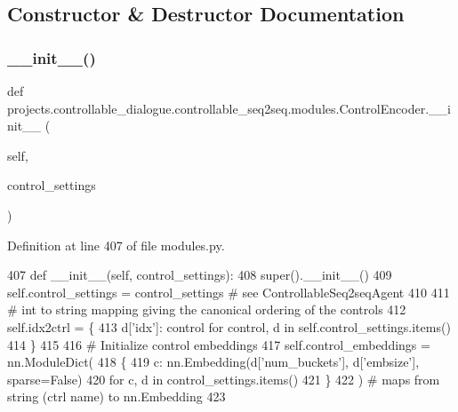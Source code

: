 \subsection{Constructor \& Destructor Documentation}
\mbox{\label{classprojects_1_1controllable__dialogue_1_1controllable__seq2seq_1_1modules_1_1ControlEncoder_ab8dcfaae2104f26275f8ab019492066a}} 
\subsubsection{\texorpdfstring{\+\_\+\+\_\+init\+\_\+\+\_\+()}{\_\_init\_\_()}}
{\footnotesize\ttfamily def projects.\+controllable\+\_\+dialogue.\+controllable\+\_\+seq2seq.\+modules.\+Control\+Encoder.\+\_\+\+\_\+init\+\_\+\+\_\+ (\begin{DoxyParamCaption}\item[{}]{self,  }\item[{}]{control\+\_\+settings }\end{DoxyParamCaption})}



Definition at line 407 of file modules.\+py.


\begin{DoxyCode}
407     \textcolor{keyword}{def }\_\_init\_\_(self, control\_settings):
408         super().\_\_init\_\_()
409         self.control\_settings = control\_settings  \textcolor{comment}{# see ControllableSeq2seqAgent}
410 
411         \textcolor{comment}{# int to string mapping giving the canonical ordering of the controls}
412         self.idx2ctrl = \{
413             d[\textcolor{stringliteral}{'idx'}]: control \textcolor{keywordflow}{for} control, d \textcolor{keywordflow}{in} self.control\_settings.items()
414         \}
415 
416         \textcolor{comment}{# Initialize control embeddings}
417         self.control\_embeddings = nn.ModuleDict(
418             \{
419                 c: nn.Embedding(d[\textcolor{stringliteral}{'num\_buckets'}], d[\textcolor{stringliteral}{'embsize'}], sparse=\textcolor{keyword}{False})
420                 \textcolor{keywordflow}{for} c, d \textcolor{keywordflow}{in} control\_settings.items()
421             \}
422         )  \textcolor{comment}{# maps from string (ctrl name) to nn.Embedding}
423 
\end{DoxyCode}


